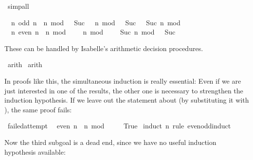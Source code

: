 \begin{isabellebody}
\begin{isamarkuptxt}
\end{isamarkuptxt}%
\isamarkuptrue%
\isamarkupfalse%
\ simp{\isacharunderscore}all%
\begin{isamarkuptxt}%
\begin{isabelle}%
\ {}{\isachardot}\ {\isasymAnd}n{\isachardot}\ odd\ n\ {\isacharequal}\ {\isacharparenleft}n\ mod\ {}\ {\isacharequal}\ Suc\ {}{\isacharparenright}\ {\isasymLongrightarrow}\ {\isacharparenleft}n\ mod\ {}\ {\isacharequal}\ Suc\ {}{\isacharparenright}\ {\isacharequal}\ {\isacharparenleft}Suc\ n\ mod\ {}\ {\isacharequal}\ {}{\isacharparenright}\isanewline
\ {}{\isachardot}\ {\isasymAnd}n{\isachardot}\ even\ n\ {\isacharequal}\ {\isacharparenleft}n\ mod\ {}\ {\isacharequal}\ {}{\isacharparenright}\ {\isasymLongrightarrow}\ {\isacharparenleft}n\ mod\ {}\ {\isacharequal}\ {}{\isacharparenright}\ {\isacharequal}\ {\isacharparenleft}Suc\ n\ mod\ {}\ {\isacharequal}\ Suc\ {}{\isacharparenright}%
\end{isabelle} 

  \noindent These can be handled by Isabelle's arithmetic decision procedures.%
\end{isamarkuptxt}%
\isamarkuptrue%
\isamarkupfalse%
\ arith\isanewline
{}\isamarkupfalse%
\ arith\isanewline
{}\isamarkupfalse%
%
\endisatagproof
{\isafoldproof}%
%
\isadelimproof
%
\endisadelimproof
%
\begin{isamarkuptext}%
In proofs like this, the simultaneous induction is really essential:
  Even if we are just interested in one of the results, the other
  one is necessary to strengthen the induction hypothesis. If we leave
  out the statement about  (by substituting it with ), the same proof fails:%
\end{isamarkuptext}%
\isamarkuptrue%
\isamarkupfalse%
\ failed{\isacharunderscore}attempt{\isacharcolon}\isanewline
\ \ {\isachardoublequoteopen}even\ n\ {\isacharequal}\ {\isacharparenleft}n\ mod\ {}\ {\isacharequal}\ {}{\isacharparenright}{\isachardoublequoteclose}\isanewline
\ \ {\isachardoublequoteopen}True{\isachardoublequoteclose}\isanewline
%
\isadelimproof
%
\endisadelimproof
%
\isatagproof
{}\isamarkupfalse%
\ {\isacharparenleft}induct\ n\ rule{\isacharcolon}\ even{\isacharunderscore}odd{\isachardot}induct{\isacharparenright}%
\begin{isamarkuptxt}%
\noindent Now the third subgoal is a dead end, since we have no
  useful induction hypothesis available:


\end{isamarkuptxt}
\end{isabellebody}
